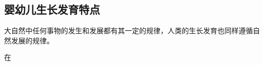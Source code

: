 \documentclass{book}%
\begin{document}

\subsection{婴幼儿生长发育特点}

大自然中任何事物的发生和发展都有其一定的规律，人类的生长发育也同样遵循自然发展的规律。








在
% 
\end{document}
